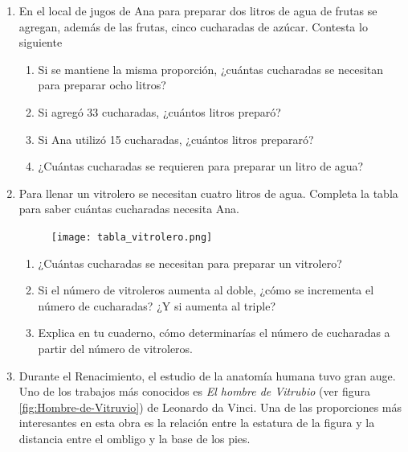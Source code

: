 \documentclass[11pt]{book}
\begin{document}
\begin{enumerate}
  \item En el local de jugos de Ana para preparar dos litros de agua de frutas se agregan,
        además de las frutas, cinco cucharadas de azúcar. Contesta lo siguiente
        \begin{enumerate}
          \item Si se mantiene la misma proporción, ¿cuántas cucharadas se necesitan para preparar ocho litros?
          \item Si agregó 33 cucharadas, ¿cuántos litros preparó?
          \item Si Ana utilizó 15 cucharadas, ¿cuántos litros prepararó?
          \item ¿Cuántas cucharadas se requieren para preparar un litro de agua?
        \end{enumerate}
  \item  Para llenar un vitrolero se necesitan cuatro litros de agua. Completa la tabla para
        saber cuántas cucharadas necesita Ana.
        \begin{figure}[H]
          \centering
          \texttt{[image: tabla\_vitrolero.png]}
          \label{tab:tabla_vitrolero}
        \end{figure}
        \begin{enumerate}
          \item ¿Cuántas cucharadas se necesitan para preparar un vitrolero?
          \item Si el número de vitroleros aumenta al doble, ¿cómo se incrementa el número de
                cucharadas? ¿Y si aumenta al triple?
          \item Explica en tu cuaderno, cómo determinarías el número de cucharadas a partir del
                número de vitroleros.
        \end{enumerate}

  \item Durante el Renacimiento, el estudio de la anatomía humana tuvo gran auge. Uno
        de los trabajos más conocidos es \emph{El hombre de Vitrubio} (ver figura \ref{fig:Hombre-de-Vitruvio}) de Leonardo
        da Vinci. Una de las proporciones más interesantes en esta obra es la relación entre
        la estatura de la figura y la distancia entre el ombligo y la base de los pies.


\end{enumerate}
\end{document}
